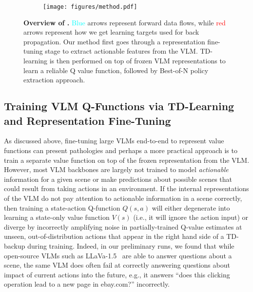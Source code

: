 \begin{figure}[t]
\centering
     \begin{subfigure}[b]{0.98\textwidth}
    \texttt{[image: figures/method.pdf]}
     \end{subfigure}
     \vspace{2mm}
     \caption{\footnotesize{\textbf{Overview of \ourmethod.} \textcolor{cyan}{Blue} arrows represent forward data flows, while \textcolor{red}{red} arrows represent how we get learning targets used for back propagation. Our method first goes through a representation fine-tuning stage to extract actionable features from the VLM. TD-learning is then performed on top of frozen VLM representations to learn a reliable Q value function, followed by Best-of-N policy extraction approach.}}
        \label{fig:method}
        \vspace{-0.3cm}
\end{figure}

\vspace{-0.1cm}
\subsection{Training VLM Q-Functions via TD-Learning and Representation Fine-Tuning} \label{sec:method-tune-vlm}
\vspace{-0.1cm}
As discussed above, fine-tuning large VLMs end-to-end to represent value functions can present pathologies and perhaps a more practical approach is to train a separate value function on top of the frozen representation from the VLM. However, most VLM backbones are largely not trained to model \emph{actionable} information for a given scene or make predictions about possible scenes that could result from taking actions in an environment. If the internal representations of the VLM do not pay attention to actionable information in a scene correctly, then training a state-action Q-function $Q(s, a)$ will either degenerate into learning a state-only value function $V(s)$ (i.e., it will ignore the action input) or diverge by incorrectly amplifying noise in partially-trained  Q-value estimates at unseen, out-of-distribution actions that appear in the right hand side of a TD-backup during training. Indeed, in our preliminary runs, we found that while open-source VLMs such as LLaVa-1.5~\citep{liu2024improvedbaselinesvisualinstruction} are able to answer questions about a scene, the same VLM does often fail at correctly answering questions about impact of current actions into the future, e.g., it answers ``does this clicking operation lead to a new page in ebay.com?'' incorrectly. 

